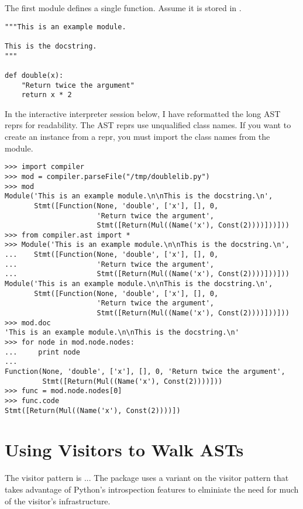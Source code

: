 The first module defines a single function.  Assume it is stored in
. 

\begin{verbatim}
"""This is an example module.

This is the docstring.
"""

def double(x):
    "Return twice the argument"
    return x * 2
\end{verbatim}

In the interactive interpreter session below, I have reformatted the
long AST reprs for readability.  The AST reprs use unqualified class
names.  If you want to create an instance from a repr, you must import
the class names from the  module.

\begin{verbatim}
>>> import compiler
>>> mod = compiler.parseFile("/tmp/doublelib.py")
>>> mod
Module('This is an example module.\n\nThis is the docstring.\n', 
       Stmt([Function(None, 'double', ['x'], [], 0,
                      'Return twice the argument', 
                      Stmt([Return(Mul((Name('x'), Const(2))))]))]))
>>> from compiler.ast import *
>>> Module('This is an example module.\n\nThis is the docstring.\n', 
...    Stmt([Function(None, 'double', ['x'], [], 0,
...                   'Return twice the argument', 
...                   Stmt([Return(Mul((Name('x'), Const(2))))]))]))
Module('This is an example module.\n\nThis is the docstring.\n', 
       Stmt([Function(None, 'double', ['x'], [], 0,
                      'Return twice the argument', 
                      Stmt([Return(Mul((Name('x'), Const(2))))]))]))
>>> mod.doc
'This is an example module.\n\nThis is the docstring.\n'
>>> for node in mod.node.nodes:
...     print node
... 
Function(None, 'double', ['x'], [], 0, 'Return twice the argument',
         Stmt([Return(Mul((Name('x'), Const(2))))]))
>>> func = mod.node.nodes[0]
>>> func.code
Stmt([Return(Mul((Name('x'), Const(2))))])
\end{verbatim}

\section{Using Visitors to Walk ASTs}


The visitor pattern is ...  The  package uses a
variant on the visitor pattern that takes advantage of Python's
introspection features to elminiate the need for much of the visitor's
infrastructure.

